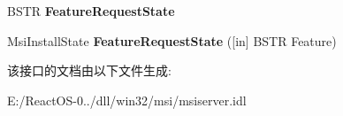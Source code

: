 \begin{DoxyCompactItemize}
\item 
\mbox{\label{interface_windows_installer_1_1_session_a25a045d555d30eac3dc9f58ae33d6d12}} 
B\+S\+TR {\bfseries Feature\+Request\+State}
\item 
\mbox{\label{interface_windows_installer_1_1_session_a155a38e3135f3ed8e29c46d50998a7d3}} 
Msi\+Install\+State {\bfseries Feature\+Request\+State} (\mbox{[}in\mbox{]} B\+S\+TR Feature)
\end{DoxyCompactItemize}


该接口的文档由以下文件生成\+:\begin{DoxyCompactItemize}
\item 
E\+:/\+React\+O\+S-\/0../dll/win32/msi/msiserver.\+idl\end{DoxyCompactItemize}
